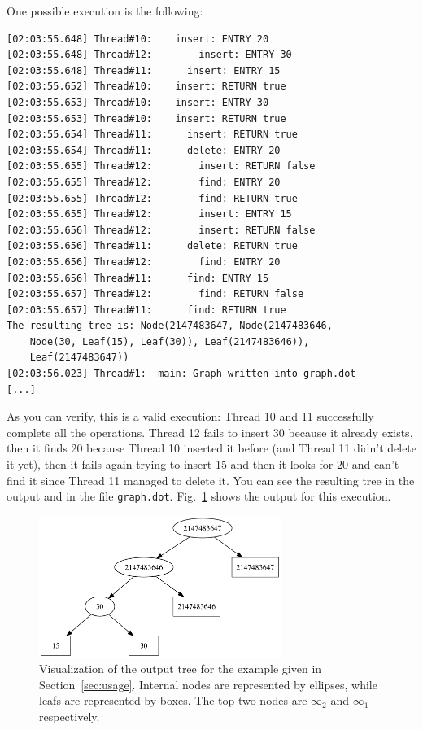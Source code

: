 \documentclass[a4paper,draft,12pt]{article}
\begin{document}
One possible execution is the following:
\begin{verbatim}
[02:03:55.648] Thread#10:    insert: ENTRY 20
[02:03:55.648] Thread#12:        insert: ENTRY 30
[02:03:55.648] Thread#11:      insert: ENTRY 15
[02:03:55.652] Thread#10:    insert: RETURN true
[02:03:55.653] Thread#10:    insert: ENTRY 30
[02:03:55.653] Thread#10:    insert: RETURN true
[02:03:55.654] Thread#11:      insert: RETURN true
[02:03:55.654] Thread#11:      delete: ENTRY 20
[02:03:55.655] Thread#12:        insert: RETURN false
[02:03:55.655] Thread#12:        find: ENTRY 20
[02:03:55.655] Thread#12:        find: RETURN true
[02:03:55.655] Thread#12:        insert: ENTRY 15
[02:03:55.656] Thread#12:        insert: RETURN false
[02:03:55.656] Thread#11:      delete: RETURN true
[02:03:55.656] Thread#12:        find: ENTRY 20
[02:03:55.656] Thread#11:      find: ENTRY 15
[02:03:55.657] Thread#12:        find: RETURN false
[02:03:55.657] Thread#11:      find: RETURN true
The resulting tree is: Node(2147483647, Node(2147483646,
    Node(30, Leaf(15), Leaf(30)), Leaf(2147483646)),
    Leaf(2147483647))
[02:03:56.023] Thread#1:  main: Graph written into graph.dot
[...]
\end{verbatim}

As you can verify, this is a valid execution: Thread 10 and 11 successfully complete all the operations.
Thread 12 fails to insert 30 because it already exists, then it finds 20 because Thread 10 inserted it before (and Thread 11 didn't delete it yet), then it fails again trying to insert 15 and then it looks for 20 and can't find it since Thread 11 managed to delete it.
You can see the resulting tree in the output and in the file \texttt{graph.dot}.
Fig.~\ref{fig:test} shows the output for this execution.

\begin{figure}
    \centering
    \includegraphics[width=0.7\textwidth]{test}
    \caption{
    Visualization of the output tree for the example given in Section~\ref{sec:usage}.
    Internal nodes are represented by ellipses, while leafs are represented by boxes.
    The top two nodes are $\infty_2$ and $\infty_1$ respectively.
    }
    \label{fig:test}
\end{figure}
\end{document}

